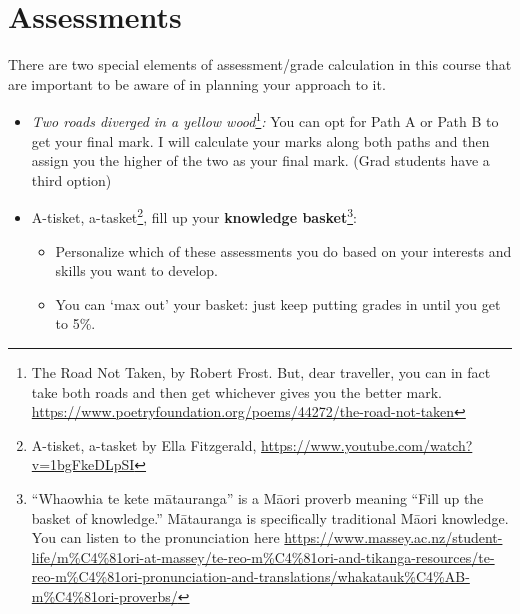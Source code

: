 \documentclass[
  openany]{book}
\begin{document}
\hypertarget{assessments}{%
\section{Assessments}\label{assessments}}

There are two special elements of assessment/grade calculation in this course that are important to be aware of in planning your approach to it.

\begin{itemize}
\item
  \emph{Two roads diverged in a yellow wood}\footnote{The Road Not Taken, by Robert Frost. But, dear traveller, you can in fact take both roads and then get whichever gives you the better mark. \url{https://www.poetryfoundation.org/poems/44272/the-road-not-taken}}\emph{:} You can opt for Path A or Path B to get your final mark. I will calculate your marks along both paths and then assign you the higher of the two as your final mark. (Grad students have a third option)
\item
  A-tisket, a-tasket\footnote{A-tisket, a-tasket by Ella Fitzgerald, \url{https://www.youtube.com/watch?v=1bgFkeDLpSI}}, fill up your \textbf{knowledge basket}\footnote{``Whaowhia te kete mātauranga'' is a Māori proverb meaning ``Fill up the basket of knowledge.'' Mātauranga is specifically traditional Māori knowledge. You can listen to the pronunciation here \url{https://www.massey.ac.nz/student-life/m\%C4\%81ori-at-massey/te-reo-m\%C4\%81ori-and-tikanga-resources/te-reo-m\%C4\%81ori-pronunciation-and-translations/whakatauk\%C4\%AB-m\%C4\%81ori-proverbs/}}:

  \begin{itemize}
  \item
    Personalize which of these assessments you do based on your interests and skills you want to develop.
  \item
    You can `max out' your basket: just keep putting grades in until you get to 5\%.
  \end{itemize}
\end{itemize}
\end{document}
